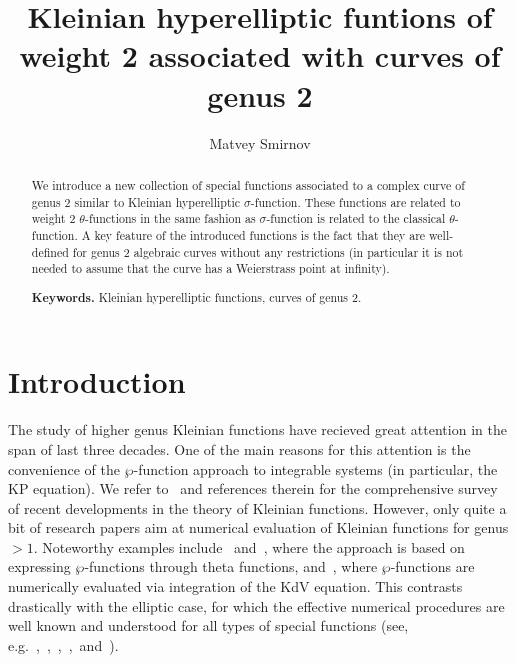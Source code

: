 \documentclass{amsart}
\numberwithin{equation}{section}
\theoremstyle{definition}
\theoremstyle{remark}
\begin{document}
	\title[Kleinian hyperelliptic funtions of weight 2]{Kleinian hyperelliptic funtions of weight 2 associated with curves of genus 2}
	
	\author{Matvey Smirnov}
	\address{119991 Russia, Moscow GSP-1, ul. Gubkina 8,
		Institute for Numerical Mathematics,
		Russian Academy of Sciences}


	\begin{abstract}
		We introduce a new collection of special functions associated to a complex curve of genus 2 similar to Kleinian hyperelliptic $\sigma$-function. These functions are related to weight 2 $\theta$-functions in the same fashion as $\sigma$-function is related to the classical $\theta$-function. A key feature of the introduced functions is the fact that they are well-defined for genus 2 algebraic curves without any restrictions (in particular it is not needed to assume that the curve has a Weierstrass point at infinity).
		
		\smallskip
		\noindent \textbf{Keywords.} Kleinian hyperelliptic functions, curves of genus 2.
	\end{abstract}
	\maketitle

    \section{Introduction}
	The study of higher genus Kleinian functions have recieved great attention in the span of last three decades. One of the main reasons for this attention is the convenience of the $\wp$-function approach to integrable systems (in particular, the KP equation). We refer to~\cite{BuchOldAndNew} and references therein for the comprehensive survey of recent developments in the theory of Kleinian functions. However, only quite a bit of research papers aim at numerical evaluation of Kleinian functions for genus $>1$. Noteworthy examples include~\cite{Bernatska1} and~\cite{Bernatska2}, where the approach is based on expressing $\wp$-functions through theta functions, and~\cite{Matsutani}, where $\wp$-functions are numerically evaluated via integration of the KdV equation. This contrasts drastically with the elliptic case, for which the effective numerical procedures are well known and understood for all types of special functions (see, e.g.~\cite{Smirnov},~\cite{Cremona},~\cite{labrandeg1},~\cite{Johansson},~and~\cite{luther}). 
	
\end{document}

